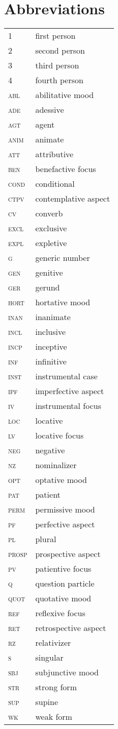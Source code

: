 \chapter*{Abbreviations}

	\begin{longtabu} to 0.8
		1		& first person\\
		2		& second person\\
		3		& third person\\
		4		& fourth person\\
		abl		& abilitative mood\\
		ade		& adessive\\
		agt		& agent\\
		anim	& animate\\
		att		& attributive\\
		ben		& benefactive focus\\
		cond	& conditional\\
		ctpv	& contemplative aspect\\
		cv		& converb\\
		excl	& exclusive\\
		expl	& expletive\\
		g		& generic number\\
		gen 	& genitive\\
		ger		& gerund\\
		hort	& hortative mood\\
		inan	& inanimate\\
		incl	& inclusive\\
		incp	& inceptive\\
		inf		& infinitive\\
		inst	& instrumental case\\
		ipf		& imperfective aspect\\
		iv		& instrumental focus\\
		loc		& locative\\
		lv		& locative focus\\
		neg		& negative\\
		nz		& nominalizer\\
		opt		& optative mood\\
		pat		& patient\\
		perm	& permissive mood\\
		pf		& perfective aspect\\
		pl		& plural\\
		prosp	& prospective aspect\\
		pv		& patientive focus\\
		q		& question particle\\
		quot	& quotative mood\\
		ref		& reflexive focus\\
		ret		& retrospective aspect\\
		rz		& relativizer\\
		s		& singular\\
		sbj		& subjunctive mood\\
		str		& strong form\\
		sup		& supine\\
		wk		& weak form\\
	\end{longtabu}
